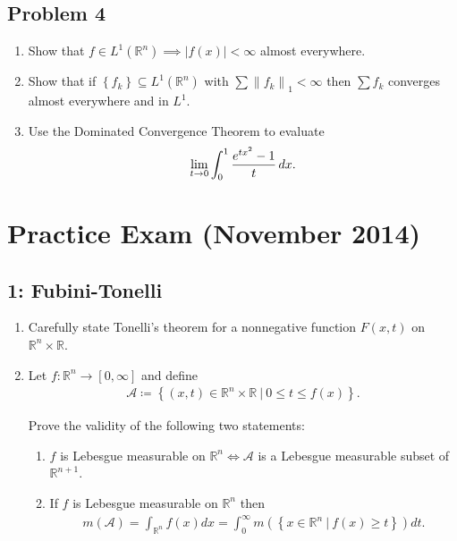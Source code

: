\hypertarget{problem-4-2}{%
\subsection{Problem 4}\label{problem-4-2}}

\begin{enumerate}
\def\labelenumi{\alph{enumi}.}
\item
  Show that
  \(f\in L^1({\mathbb{R}}^n) \implies {\left\lvert {f(x)} \right\rvert} < \infty\)
  almost everywhere.
\item
  Show that if \(\left\{{f_k}\right\} \subseteq L^1({\mathbb{R}}^n)\)
  with \(\sum {\left\lVert {f_k} \right\rVert}_1 < \infty\) then
  \(\sum f_k\) converges almost everywhere and in \(L^1\).
\item
  Use the Dominated Convergence Theorem to evaluate
  \begin{align*}
  \lim_{t\to 0} \int_0^1 {e^{tx^2} - 1 \over t} \,dx
  .\end{align*}
\end{enumerate}

\hypertarget{practice-exam-november-2014-1}{%
\section{Practice Exam (November
2014)}\label{practice-exam-november-2014-1}}

\hypertarget{fubini-tonelli}{%
\subsection{1: Fubini-Tonelli}\label{fubini-tonelli}}

\begin{enumerate}
\def\labelenumi{\alph{enumi}.}
\item
  Carefully state Tonelli's theorem for a nonnegative function
  \(F(x, t)\) on \({\mathbb{R}}^n\times{\mathbb{R}}\).
\item
  Let \(f:{\mathbb{R}}^n\to [0, \infty]\) and define
  \begin{align*}
  {\mathcal{A}}\coloneqq\left\{{(x, t) \in {\mathbb{R}}^n\times{\mathbb{R}}{~\mathrel{\Big|}~}0\leq t \leq f(x)}\right\}
  .\end{align*}

  Prove the validity of the following two statements:

  \begin{enumerate}
  \def\labelenumii{\arabic{enumii}.}
  \tightlist
  \item
    \(f\) is Lebesgue measurable on
    \({\mathbb{R}}^{n} \iff {\mathcal{A}}\) is a Lebesgue measurable
    subset of \({\mathbb{R}}^{n+1}\).
  \item
    If \(f\) is Lebesgue measurable on \({\mathbb{R}}^n\) then
    \begin{align*}
    m(\mathcal{A})=\int_{\mathbb{R}^{n}} f(x) d x=\int_{0}^{\infty} m\left(\left\{x \in \mathbb{R}^{n}{~\mathrel{\Big|}~}f(x) \geq t\right\}\right) d t
    .\end{align*}
  \end{enumerate}
\end{enumerate}

